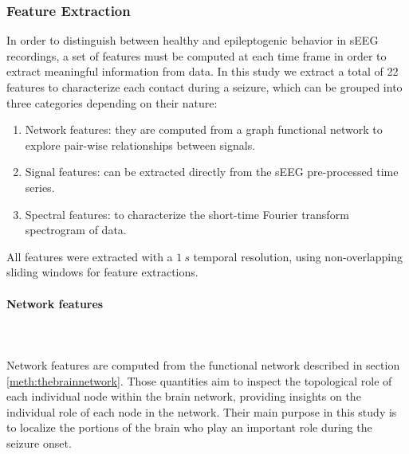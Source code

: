 \subsubsection{Feature Extraction} \label{meth:features}

In order to distinguish between healthy and epileptogenic behavior in sEEG
recordings, a set of features must be computed at each time frame in order to
extract meaningful information from data.
In this study we extract a total of 22 features to characterize each
contact during a seizure, which can be grouped into three categories depending
on their nature:
\begin{enumerate}
    \item Network features: they are computed from a graph functional network to
    explore pair-wise relationships between signals.
    \item Signal features: can be extracted directly from the sEEG
    pre-processed time series.
    \item Spectral features: to characterize the short-time Fourier
    transform spectrogram of data.
\end{enumerate}
All features were extracted with a $1\ s$ temporal resolution, using
non-overlapping sliding windows for feature extractions.

\paragraph{Network features}~\\
\\
Network features are computed from the functional network
described in section \ref{meth:thebrainnetwork}.
Those quantities aim to inspect the topological role of each individual node
within the brain network, providing insights on the individual role of each
node in the network.
Their main purpose in this study is to localize the portions of the brain who
play an important role during the seizure onset.

